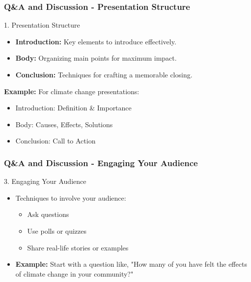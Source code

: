 \documentclass[aspectratio=169]{beamer}
\begin{document}
\begin{frame}[fragile]
    \frametitle{Q\&A and Discussion - Presentation Structure}
    \begin{block}{1. Presentation Structure}
        \begin{itemize}
            \item \textbf{Introduction:} Key elements to introduce effectively.
            \item \textbf{Body:} Organizing main points for maximum impact.
            \item \textbf{Conclusion:} Techniques for crafting a memorable closing.
        \end{itemize}
        \textbf{Example:} For climate change presentations:
        \begin{itemize}
            \item Introduction: Definition \& Importance
            \item Body: Causes, Effects, Solutions
            \item Conclusion: Call to Action
        \end{itemize}
    \end{block}
\end{frame}

\begin{frame}[fragile]
    \frametitle{Q\&A and Discussion - Engaging Your Audience}
    \begin{block}{3. Engaging Your Audience}
        \begin{itemize}
            \item Techniques to involve your audience:
            \begin{itemize}
                \item Ask questions
                \item Use polls or quizzes
                \item Share real-life stories or examples
            \end{itemize}
            \item \textbf{Example:} Start with a question like, "How many of you have felt the effects of climate change in your community?"
        \end{itemize}
    \end{block}
\end{frame}
\end{document}
